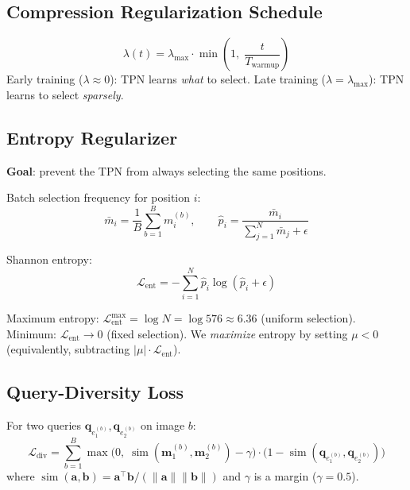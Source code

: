\documentclass[11pt,a4paper]{article}
\DeclareMathOperator{\simop}{sim}
\newcommand{\qe}{\mathbf{q}_e}
\newcommand{\vm}{\mathbf{m}}
\begin{document}
\subsection{Compression Regularization Schedule}

\begin{equation}
  \lambda(t) = \lambda_{\max} \cdot
    \min\!\left(1,\; \frac{t}{T_{\text{warmup}}}\right)
  \label{eq:lambda_schedule}
\end{equation}
Early training ($\lambda \approx 0$): TPN learns \emph{what} to select.
Late training ($\lambda = \lambda_{\max}$): TPN learns to select
\emph{sparsely}.

\subsection{Entropy Regularizer}

\textbf{Goal}: prevent the TPN from always selecting the same positions.

Batch selection frequency for position $i$:
\begin{equation}
  \bar{m}_i = \frac{1}{B}\sum_{b=1}^{B} m_i^{(b)},
  \qquad
  \hat{p}_i = \frac{\bar{m}_i}{\sum_{j=1}^{N} \bar{m}_j + \epsilon}
\end{equation}

Shannon entropy:
\begin{equation}
  \mathcal{L}_{\text{ent}}
    = -\sum_{i=1}^{N} \hat{p}_i \log(\hat{p}_i + \epsilon)
  \label{eq:entropy_reg}
\end{equation}

Maximum entropy: $\mathcal{L}_{\text{ent}}^{\max} = \log N = \log 576
\approx 6.36$ (uniform selection). Minimum: $\mathcal{L}_{\text{ent}}
\to 0$ (fixed selection). We \emph{maximize} entropy by setting $\mu < 0$
(equivalently, subtracting $|\mu| \cdot \mathcal{L}_{\text{ent}}$).

\subsection{Query-Diversity Loss}

For two queries $\qe_1^{(b)}, \qe_2^{(b)}$ on image $b$:
\begin{equation}
  \mathcal{L}_{\text{div}} = \sum_{b=1}^{B}
    \max\!\bigl(0,\;
      \simop(\vm_1^{(b)}, \vm_2^{(b)}) - \gamma
    \bigr)
    \cdot
    \bigl(1 - \simop(\qe_1^{(b)}, \qe_2^{(b)})\bigr)
  \label{eq:div_loss}
\end{equation}
where $\simop(\mathbf{a},\mathbf{b}) = \mathbf{a}^\top\mathbf{b} /
(\|\mathbf{a}\|\|\mathbf{b}\|)$ and $\gamma$ is a margin ($\gamma = 0.5$).
\end{document}
